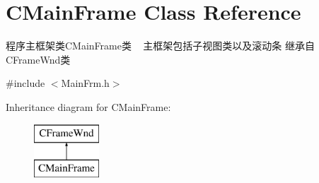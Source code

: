 \hypertarget{class_c_main_frame}{}\section{C\+Main\+Frame Class Reference}
\label{class_c_main_frame}


程序主框架类\+C\+Main\+Frame类 ~\newline
主框架包括子视图类以及滚动条 继承自\+C\+Frame\+Wnd类  




{\ttfamily \#include $<$Main\+Frm.\+h$>$}

Inheritance diagram for C\+Main\+Frame\+:\begin{figure}[H]
\begin{center}
\leavevmode
\includegraphics[height=2.000000cm]{class_c_main_frame}
\end{center}
\end{figure}
